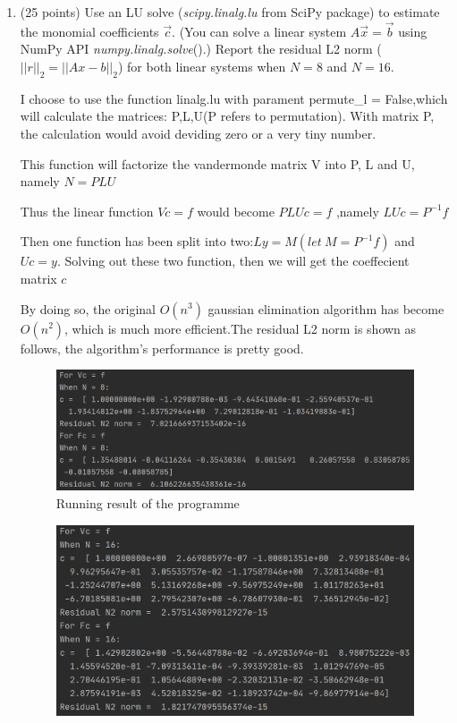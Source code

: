 \documentclass[10pt]{article}
\begin{document}
\begin{enumerate}[label=3.\arabic*]
    \item (25 points) \label{q:3.1}
    Use an LU solve (\textit{scipy.linalg.lu} from SciPy package) to estimate the monomial coefficients $\vec{c}$. (You can solve a linear system $A
    \vec{x}=\vec{b}$ using NumPy API \textit{numpy.linalg.solve}().)
    Report the residual L2 norm ($||r||_2=||Ax-b||_2$) for both linear systems when $N = 8$ and $N = 16$.\par
    I choose to use the function linalg.lu with parament permute\_l = False,which will calculate the matrices: P,L,U(P refers to permutation). With matrix P, the calculation would avoid deviding zero or a very tiny number.\par
    This function will factorize the vandermonde matrix V into P, L and U, namely $N=PLU$\par
    Thus the linear function $Vc=f$ would become $PLUc=f$ ,namely $LUc=P^{-1}f$\par
    Then one function has been split into two:$Ly=M(let\ M = P^{-1}f)$ and $Uc=y$. Solving out these two function, then we will get the coeffecient matrix $c$\par
    By doing so, the original $O(n^3)$ gaussian elimination algorithm has become $O(n^2)$, which is much more efficient.The residual L2 norm is shown as follows, the algorithm's performance is pretty good.\par 
    \begin{figure}[H]
    	\centering
    	\includegraphics[width=1\textwidth]{./linear algebra/result_1.png}
    	\caption{Running result of the programme}
    \end{figure}
	\begin{figure}[H]
		\centering
		\includegraphics[width=1\textwidth]{./linear algebra/result_2.png}

\end{figure}
\end{enumerate}
\end{document}
